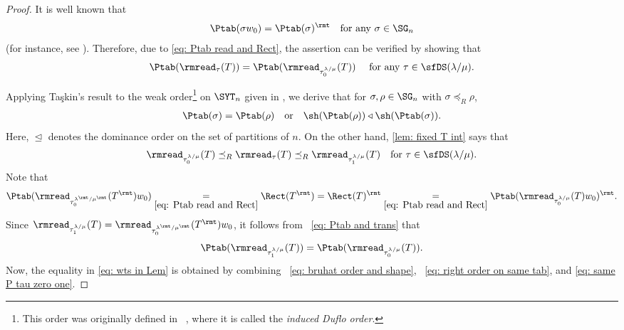 \documentclass[12pt, reqno]{amsart}
\theoremstyle{definition}
\numberwithin{equation}{section} \numberwithin{figure}{section}
\numberwithin{table}{section}
\begin{document}
\begin{proof}
It is well known that
\begin{align}\label{eq: Ptab and trans}
\Ptab(\sigma w_0) = \Ptab(\sigma)^\rmt
\quad \text{for any $\sigma \in \SG_n$}    
\end{align}
(for instance, see \cite[Theorems 3.2.3]{91Sag}).
Therefore, 
due to \cref{eq: Ptab read and Rect},
the assertion can be verified by showing  that 
\begin{align}\label{eq: wts in Lem}
\Ptab(\rmread_{\tau}(T)) = \Ptab(\rmread_{\tau^{\lambda/\mu}_0}(T))
\quad 
\text{
for any $\tau \in \sfDS(\lambda/\mu)$.}
\end{align}

Applying Ta\c{s}kin's result \cite[Proposition 3.2.5]{06Taskin} to the weak order\footnote{This order was originally defined in ~\cite[2.5.1]{04Mel}, where it is called the \emph{induced Duflo order}.}  on $\SYT_n$ given in \cite[Definition 3.1.3]{06Taskin}, we derive that for $\sigma, \rho \in \SG_n$ with $\sigma \preceq_R \rho$,
\begin{align}\label{eq: bruhat order and shape}
\Ptab(\sigma) = \Ptab(\rho)
\quad \text{or} \quad
\sh(\Ptab(\rho)) \triangleleft \sh(\Ptab(\sigma)).
\end{align}
Here, $\trianglelefteq$ denotes the dominance order on the set of partitions of $n$.
On the other hand,   \cref{lem: fixed T int} says that  
\begin{align}\label{eq: right order on same tab}
\rmread_{\tau_0^{\lambda/\mu}}(T) \preceq_R \rmread_{\tau}(T) \preceq_R \rmread_{\tau_1^{\lambda/\mu}}(T) \quad \text{for $\tau \in \sfDS(\lambda/\mu)$}.
\end{align}
Note that 
\[
\Ptab(\rmread_{\tau^{\lambda^\rmt/\mu^\rmt}_0}(T^\rmt)w_0)
\underset{\cref{eq: Ptab read and Rect}}{=} \Rect(T^\rmt)
= \Rect(T)^\rmt
\underset{\cref{eq: Ptab read and Rect}}{=} \Ptab(\rmread_{\tau^{\lambda/\mu}_0}(T)w_0)^\rmt.
\]
Since $\rmread_{\tau^{\lambda/\mu}_1}(T) = 
\rmread_{\tau^{\lambda^\rmt/\mu^\rmt}_0}(T^\rmt) w_0$,
it follows from ~\cref{eq: Ptab and trans} that 
\begin{align}\label{eq: same P tau zero one}
\Ptab(\rmread_{\tau^{\lambda/\mu}_1}(T)) 
= \Ptab(\rmread_{\tau^{\lambda/\mu}_0}(T)).
\end{align}
Now, the equality in \cref{eq: wts in Lem} is obtained by combining ~\cref{eq: bruhat order and shape}, ~\cref{eq: right order on same tab}, and \cref{eq: same P tau zero one}.
\end{proof}
\end{document}
